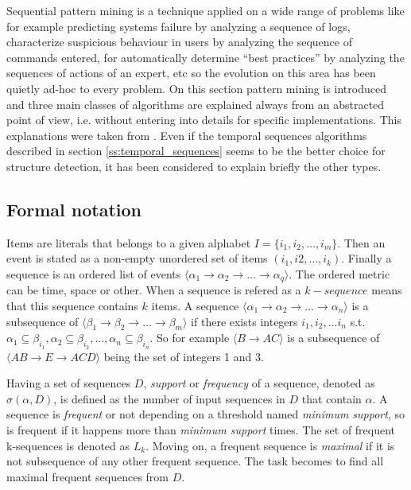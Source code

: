 Sequential pattern mining is a technique applied on a wide range of problems
like for example predicting systems failure by analyzing a sequence of logs,
characterize suspicious behaviour in users by analyzing the sequence of commands
entered, for automatically determine “best practices” by analyzing the sequences
of actions of an expert, etc so the evolution on this area has been quietly
ad-hoc to every problem. On this section pattern mining is introduced and three
main classes of algorithms are explained always from an abstracted point of
view, i.e. without entering into details for specific implementations. This
explanations were taken from \cite{mooney2013sequential}. Even if the temporal
sequences algorithms described in section \ref{ss:temporal_sequences} seems to
be the better choice for structure detection, it has been considered to explain
briefly the other types.

\subsection{Formal notation}

Items are literals that belongs to a given alphabet $I=\{i_{1}, i_{2}, \dots,
i_{m}\}$. Then an event is stated as a non-empty unordered set of items
$(i_{1}, i{2}, \dots, i_{k})$. Finally a sequence is an ordered list of
events $\langle\alpha_{1} \rightarrow \alpha_{2} \rightarrow \dots \rightarrow
\alpha_{q}\rangle$. The ordered metric can be time, space or other. When a
sequence is refered as a $k-sequence$ means that this sequence contains $k$
items. A sequence $\langle\alpha_{1} \rightarrow \alpha_{2} \rightarrow \dots 
\rightarrow \alpha_{n}\rangle$ is a subsequence of $\langle\beta_{1} \rightarrow 
\beta_{2} \rightarrow \dots \rightarrow \beta_{m}\rangle$ if there exists
integers $i_{1}, i_{2}, \dots i_{n}$ s.t. $\alpha_{1} \subseteq \beta_{i_{1}}, 
\alpha_{2} \subseteq \beta_{i_{2}}, \dots, \alpha_{n} \subseteq \beta_{i_{n}}$.
So for example $\langle B \rightarrow AC\rangle$ is a subsequence of 
$\langle AB \rightarrow E \rightarrow ACD \rangle$ being the set of integers 1
and 3.

Having a set of sequences $D$, {\it support} or {\it frequency} of a sequence,
denoted as $\sigma(\alpha, D)$, is defined as the number of input sequences in $D$
that contain $\alpha$. A sequence is {\it frequent} or not depending on a
threshold named {\it minimum support}, so is frequent if it happens more than
{\it minimum support} times. The set of frequent k-sequences is denoted as
$L_{k}$. Moving on, a frequent sequence is {\it maximal} if it is not subsequence
of any other frequent sequence. The task becomes to find all maximal frequent
sequences from $D$.

